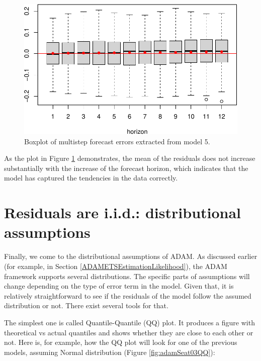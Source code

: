 \documentclass[
]{book}
\theoremstyle{definition}
\theoremstyle{definition}
\theoremstyle{definition}
\theoremstyle{definition}
\theoremstyle{remark}
\begin{document}
\begin{figure}
\centering
\includegraphics{Svetunkov--2022----ADAM_files/figure-latex/adamSeat05Multistep-1.pdf}
\caption{\label{fig:adamSeat05Multistep}Boxplot of multistep forecast errors extracted from model 5.}
\end{figure}

As the plot in Figure \ref{fig:adamSeat05Multistep} demonstrates, the mean of the residuals does not increase substantially with the increase of the forecast horizon, which indicates that the model has captured the tendencies in the data correctly.

\hypertarget{diagnosticsResidualsIIDDistribution}{%
\section{Residuals are i.i.d.: distributional assumptions}\label{diagnosticsResidualsIIDDistribution}}

Finally, we come to the distributional assumptions of ADAM. As discussed earlier (for example, in Section \ref{ADAMETSEstimationLikelihood}), the ADAM framework supports several distributions. The specific parts of assumptions will change depending on the type of error term in the model. Given that, it is relatively straightforward to see if the residuals of the model follow the assumed distribution or not. There exist several tools for that.

The simplest one is called Quantile-Quantile (QQ) plot. It produces a figure with theoretical vs actual quantiles and shows whether they are close to each other or not. Here is, for example, how the QQ plot will look for one of the previous models, assuming Normal distribution (Figure \ref{fig:adamSeat03QQ}):
\end{document}
